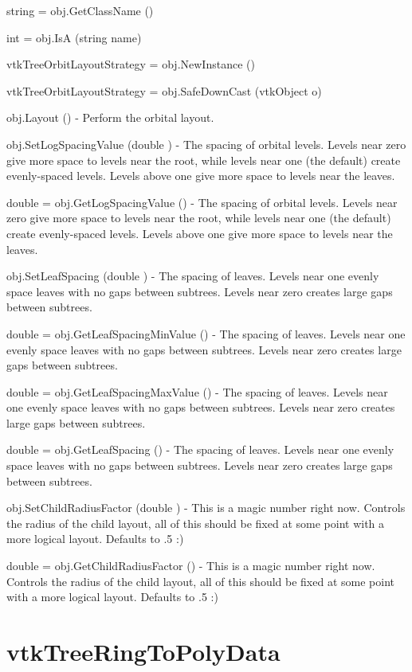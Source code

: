 \begin{DoxyItemize}
\item {\ttfamily string = obj.\-Get\-Class\-Name ()}  
\item {\ttfamily int = obj.\-Is\-A (string name)}  
\item {\ttfamily vtk\-Tree\-Orbit\-Layout\-Strategy = obj.\-New\-Instance ()}  
\item {\ttfamily vtk\-Tree\-Orbit\-Layout\-Strategy = obj.\-Safe\-Down\-Cast (vtk\-Object o)}  
\item {\ttfamily obj.\-Layout ()} -\/ Perform the orbital layout.  
\item {\ttfamily obj.\-Set\-Log\-Spacing\-Value (double )} -\/ The spacing of orbital levels. Levels near zero give more space to levels near the root, while levels near one (the default) create evenly-\/spaced levels. Levels above one give more space to levels near the leaves.  
\item {\ttfamily double = obj.\-Get\-Log\-Spacing\-Value ()} -\/ The spacing of orbital levels. Levels near zero give more space to levels near the root, while levels near one (the default) create evenly-\/spaced levels. Levels above one give more space to levels near the leaves.  
\item {\ttfamily obj.\-Set\-Leaf\-Spacing (double )} -\/ The spacing of leaves. Levels near one evenly space leaves with no gaps between subtrees. Levels near zero creates large gaps between subtrees.  
\item {\ttfamily double = obj.\-Get\-Leaf\-Spacing\-Min\-Value ()} -\/ The spacing of leaves. Levels near one evenly space leaves with no gaps between subtrees. Levels near zero creates large gaps between subtrees.  
\item {\ttfamily double = obj.\-Get\-Leaf\-Spacing\-Max\-Value ()} -\/ The spacing of leaves. Levels near one evenly space leaves with no gaps between subtrees. Levels near zero creates large gaps between subtrees.  
\item {\ttfamily double = obj.\-Get\-Leaf\-Spacing ()} -\/ The spacing of leaves. Levels near one evenly space leaves with no gaps between subtrees. Levels near zero creates large gaps between subtrees.  
\item {\ttfamily obj.\-Set\-Child\-Radius\-Factor (double )} -\/ This is a magic number right now. Controls the radius of the child layout, all of this should be fixed at some point with a more logical layout. Defaults to .5 \-:)  
\item {\ttfamily double = obj.\-Get\-Child\-Radius\-Factor ()} -\/ This is a magic number right now. Controls the radius of the child layout, all of this should be fixed at some point with a more logical layout. Defaults to .5 \-:)  
\end{DoxyItemize}\hypertarget{vtkinfovis_vtktreeringtopolydata}{}\section{vtk\-Tree\-Ring\-To\-Poly\-Data}\label{vtkinfovis_vtktreeringtopolydata}
